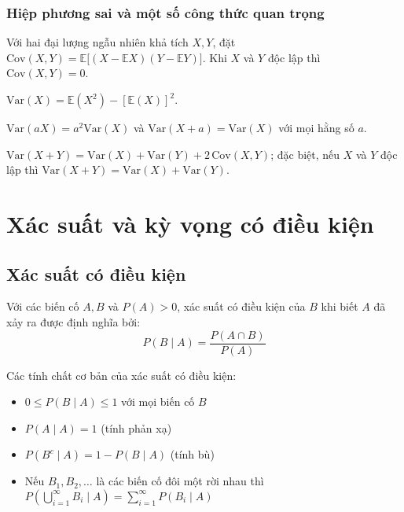 \subsubsection*{Hiệp phương sai và một số công thức quan trọng}
\begin{dn}
Với hai đại lượng ngẫu nhiên khả tích $X,Y$, đặt $\text{Cov}(X,Y)=\mathbb{E}\big[(X-\mathbb{E}X)(Y-\mathbb{E}Y)\big]$. Khi $X$ và $Y$ độc lập thì $\text{Cov}(X,Y)=0$.
\end{dn}
\begin{dl}
\begin{lietke}
  \item $\text{Var}(X)=\mathbb{E}(X^2)-[\mathbb{E}(X)]^2$.
  \item $\text{Var}(aX)=a^2\text{Var}(X)$ và $\text{Var}(X+a)=\text{Var}(X)$ với mọi hằng số $a$.
  \item $\text{Var}(X+Y)=\text{Var}(X)+\text{Var}(Y)+2\,\text{Cov}(X,Y)$; đặc biệt, nếu $X$ và $Y$ độc lập thì $\text{Var}(X+Y)=\text{Var}(X)+\text{Var}(Y)$.
\end{lietke}
\end{dl}

\section{Xác suất và kỳ vọng có điều kiện}

\subsection{Xác suất có điều kiện}
\begin{dn}
Với các biến cố $A,B$ và $P(A)>0$, xác suất có điều kiện của $B$ khi biết $A$ đã xảy ra được định nghĩa bởi:
\[
P(B\mid A)=\frac{P(A\cap B)}{P(A)}
\]
\end{dn}

\begin{tinhchat}
Các tính chất cơ bản của xác suất có điều kiện:
\begin{itemize}
    \item $0 \leq P(B\mid A) \leq 1$ với mọi biến cố $B$
    \item $P(A\mid A) = 1$ (tính phản xạ)
    \item $P(B^c\mid A) = 1 - P(B\mid A)$ (tính bù)
    \item Nếu $B_1, B_2, \ldots$ là các biến cố đôi một rời nhau thì $P(\bigcup_{i=1}^{\infty} B_i \mid A) = \sum_{i=1}^{\infty} P(B_i \mid A)$
\end{itemize}
\end{tinhchat}

